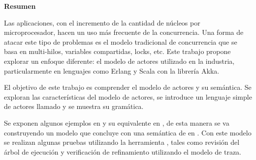 \begin{center}
\begin{LARGE}\textbf{Resumen}\end{LARGE}
\end{center}

\noindent
Las aplicaciones, con el incremento de la cantidad de núcleos por microprocesador, hacen un uso más frecuente de la concurrencia. Una forma de atacar este tipo de problemas es el modelo tradicional de concurrencia que se basa en multi-hilos, variables compartidas, locks, etc. Este trabajo propone explorar un enfoque diferente: el modelo de actores utilizado en la industria, particularmente en lenguajes como Erlang y Scala con la librería Akka.

\noindent
El objetivo de este trabajo es comprender el modelo de actores y su semántica. Se exploran las características del modelo de actores, se introduce un lenguaje simple de actores llamado \SAL y se muestra su gramática.

\noindent
Se exponen algunos ejemplos en \SAL y su equivalente en \CSP, de esta manera se va construyendo un modelo que concluye con una semántica de \SAL en \CSP. Con este modelo se realizan algunas pruebas utilizando la herramienta \FDR, tales como revisión del árbol de ejecución y verificación de refinamiento utilizando el modelo de traza.




